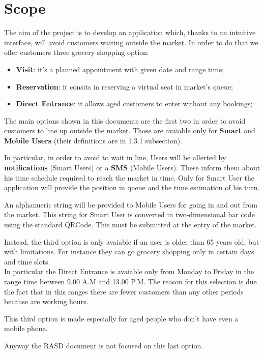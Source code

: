  
\section{Scope}

The aim of the project is to develop an application which, thanks to an intuitive interface, will avoid customers waiting outside the market.
In order to do that we offer customers three grocery shopping option: 

\begin{itemize}
\item \textbf{Visit}: it's a planned appointment with given date and range time;
\item \textbf{Reservation}: it consits in reserving a virtual seat in market's queue;
\item \textbf{Direct Entrance}: it allows aged customers to enter without any bookings;
\end{itemize}
\bigskip
The main options shown in this documents are the first two in order to avoid customers to line up outside the market. Those are avaiable only for \textbf{Smart} and \textbf{Mobile Users} (their definitions are in 1.3.1 subsection).\par
In particular, in order to avoid to wait in line, Users will be allerted by \textbf{notifications} (Smart Users) or a \textbf{SMS} (Mobile Users). These inform them about his time schedule required to reach the market in time.
Only for Smart User the application will provide the position in queue and the time estimation of his turn.\par
An alphanueric string will be provided to Mobile Users for going in and out from the market. This string for Smart User is converted in two-dimensional bar code using the standard QRCode. This must be submitted at the entry of the market.\par
Instead, the third option is only avaiable if an user is older than 65 years old, but with limitations. For instance they can go grocery shopping only in certain days and time slots. \\
In particular the Direct Entrance is avaiable only from Monday to Friday in the range time between 9.00 A.M and 13.00 P.M. The reason for this selection is due the fact that in this ranges there are fewer customers than any other periods because are working hours. \par
This third option is made especially for aged people who don't have even a mobile phone. \par
Anyway the RASD document is not focused on this last option.


